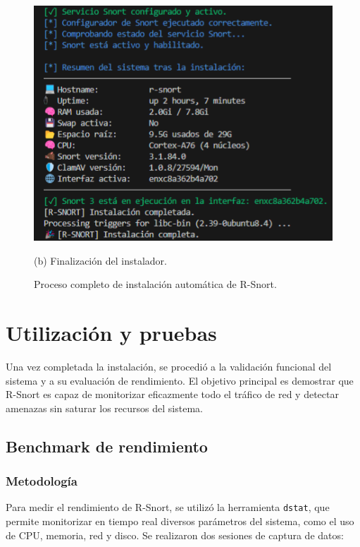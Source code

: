 \documentclass[12pt,a4paper]{report}
\begin{document}
\begin{figure}[H]
\begin{minipage}[b]{0.48\textwidth}
		\centering
		\includegraphics[scale=0.4]{pruebas_config/10-10.png}
		\caption*{(b) Finalización del instalador.}
	\end{minipage}
	\caption{Proceso completo de instalación automática de R-Snort.}
\end{figure}



\section{Utilización y pruebas}

Una vez completada la instalación, se procedió a la validación funcional del sistema y a su evaluación de rendimiento. El objetivo principal es demostrar que R-Snort es capaz de monitorizar eficazmente todo el tráfico de red y detectar amenazas sin saturar los recursos del sistema.

\subsection{Benchmark de rendimiento}

\subsubsection{Metodología}

Para medir el rendimiento de R-Snort, se utilizó la herramienta \texttt{dstat}, que permite monitorizar en tiempo real diversos parámetros del sistema, como el uso de CPU, memoria, red y disco. Se realizaron dos sesiones de captura de datos:
\end{document}
